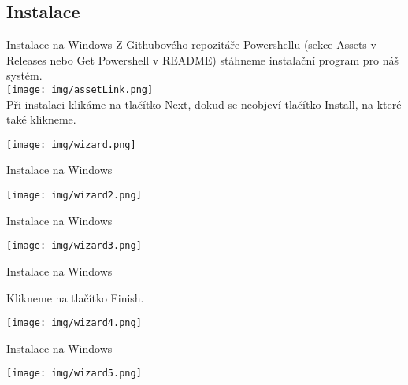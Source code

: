 \documentclass[main.tex]{subfiles}
\begin{document}
\subsection{Instalace}
\begin{frame}[allowframebreaks]{Instalace na Windows}
  Z \href{https://github.com/PowerShell/PowerShell/releases}{Githubového repozitáře} Powershellu (sekce Assets v Releases nebo Get Powershell v README) stáhneme instalační program pro náš systém.\\

  \texttt{[image: img/assetLink.png]}\\

  Při instalaci klikáme na tlačítko Next, dokud se neobjeví tlačítko Install, na které také klikneme.


  \begin{center}
  \texttt{[image: img/wizard.png]}
  \end{center}
\end{frame}
\begin{frame}{Instalace na Windows}
  \begin{center}
  \texttt{[image: img/wizard2.png]}
  \end{center}
\end{frame}

\begin{frame}{Instalace na Windows}
  \begin{center}
  \texttt{[image: img/wizard3.png]}
  \end{center}
\end{frame}

\begin{frame}{Instalace na Windows}
  \begin{center}
  Klikneme na tlačítko Finish.\\
  \end{center}
  \begin{center}

  \texttt{[image: img/wizard4.png]}
  \end{center}
\end{frame}
\begin{frame}{Instalace na Windows}
  \begin{center}
    \texttt{[image: img/wizard5.png]}
  \end{center}
\end{frame}
\end{document}
